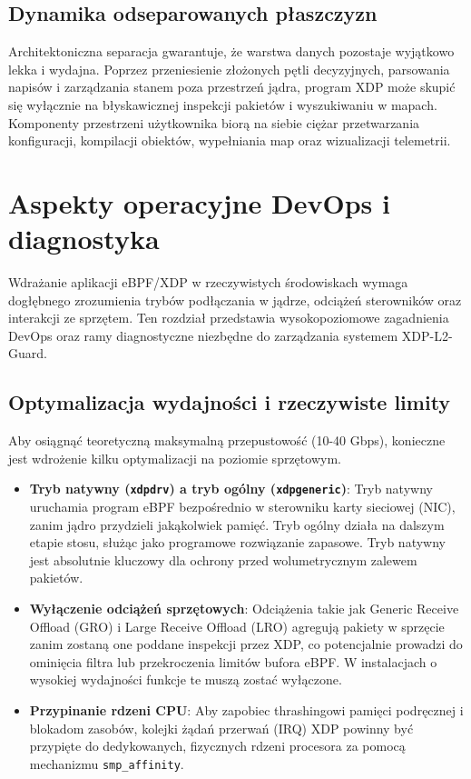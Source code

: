 \documentclass[11pt,a4paper]{article}
\begin{document}
\subsection{Dynamika odseparowanych płaszczyzn}

Architektoniczna separacja gwarantuje, że warstwa danych pozostaje wyjątkowo lekka i wydajna. Poprzez przeniesienie złożonych pętli decyzyjnych, parsowania napisów i zarządzania stanem poza przestrzeń jądra, program XDP może skupić się wyłącznie na błyskawicznej inspekcji pakietów i wyszukiwaniu w mapach. Komponenty przestrzeni użytkownika biorą na siebie ciężar przetwarzania konfiguracji, kompilacji obiektów, wypełniania map oraz wizualizacji telemetrii.

\section{Aspekty operacyjne DevOps i diagnostyka}

Wdrażanie aplikacji eBPF/XDP w rzeczywistych środowiskach wymaga dogłębnego zrozumienia trybów podłączania w jądrze, odciążeń sterowników oraz interakcji ze sprzętem. Ten rozdział przedstawia wysokopoziomowe zagadnienia DevOps oraz ramy diagnostyczne niezbędne do zarządzania systemem XDP-L2-Guard.

\subsection{Optymalizacja wydajności i rzeczywiste limity}
Aby osiągnąć teoretyczną maksymalną przepustowość (10-40 Gbps), konieczne jest wdrożenie kilku optymalizacji na poziomie sprzętowym.

\begin{itemize}
    \item \textbf{Tryb natywny (\texttt{xdpdrv}) a tryb ogólny (\texttt{xdpgeneric})}: Tryb natywny uruchamia program eBPF bezpośrednio w sterowniku karty sieciowej (NIC), zanim jądro przydzieli jakąkolwiek pamięć. Tryb ogólny działa na dalszym etapie stosu, służąc jako programowe rozwiązanie zapasowe. Tryb natywny jest absolutnie kluczowy dla ochrony przed wolumetrycznym zalewem pakietów.
    \item \textbf{Wyłączenie odciążeń sprzętowych}: Odciążenia takie jak Generic Receive Offload (GRO) i Large Receive Offload (LRO) agregują pakiety w sprzęcie zanim zostaną one poddane inspekcji przez XDP, co potencjalnie prowadzi do ominięcia filtra lub przekroczenia limitów bufora eBPF. W instalacjach o wysokiej wydajności funkcje te muszą zostać wyłączone.
    \item \textbf{Przypinanie rdzeni CPU}: Aby zapobiec thrashingowi pamięci podręcznej i blokadom zasobów, kolejki żądań przerwań (IRQ) XDP powinny być przypięte do dedykowanych, fizycznych rdzeni procesora za pomocą mechanizmu \texttt{smp\_affinity}.
\end{itemize}
\end{document}
